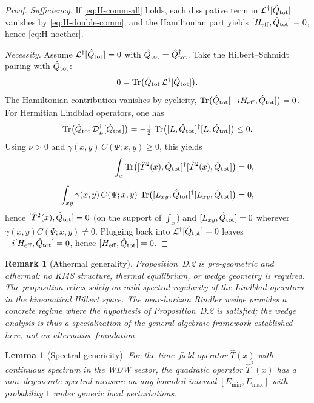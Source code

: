 \documentclass[12pt,a4paper]{article}
\newtheorem{lemma}{Lemma}[section]
\newtheorem{remark}{Remark}[section]
\renewcommand{\Tr}{\operatorname{Tr}}
\numberwithin{equation}{section}
\begin{document}
\vspace{0.3cm}
\begin{proof}
\emph{Sufficiency.} If \eqref{eq:H-comm-all} holds, each dissipative term in $\mathcal L^\dagger[\hat Q_{\rm tot}]$ vanishes by \eqref{eq:H-double-comm}, and the Hamiltonian part yields $[H_{\mathrm{eff}},\hat Q_{\rm tot}]=0$, hence \eqref{eq:H-noether}.

\vspace{0.3cm}
\noindent\emph{Necessity.}
Assume $\mathcal L^\dagger[\hat Q_{\rm tot}]=0$ with $\hat Q_{\rm tot}=\hat Q_{\rm tot}^\dagger$.
Take the Hilbert--Schmidt pairing with $\hat Q_{\rm tot}$:
\[
0=\Tr\!\big(\hat Q_{\rm tot}\,\mathcal L^\dagger[\hat Q_{\rm tot}]\big).
\]
The Hamiltonian contribution vanishes by cyclicity,
$\Tr\!\big(\hat Q_{\rm tot}[-iH_{\rm eff},\hat Q_{\rm tot}]\big)=0$.
For Hermitian Lindblad operators, one has
\[
\Tr\!\big(\hat Q_{\rm tot}\,\mathcal D_L^\dagger[\hat Q_{\rm tot}]\big)
=-\tfrac12\,\Tr\!\big([L,\hat Q_{\rm tot}]^\dagger [L,\hat Q_{\rm tot}]\big)\le 0.
\]
Using $\nu>0$ and $\gamma(x,y)\,C(\Psi;x,y)\ge 0$, this yields
\begin{align*}
\int_x \Tr\!\big([\hat T^2(x),\hat Q_{\rm tot}]^\dagger[\hat T^2(x),\hat Q_{\rm tot}]\big) &= 0, \\[6pt]
\int_{xy}\gamma(x,y)\,C(\Psi;x,y)\,
\Tr\!\big([L_{xy},\hat Q_{\rm tot}]^\dagger[L_{xy},\hat Q_{\rm tot}]\big) &= 0,
\end{align*}
hence $[\hat T^2(x),\hat Q_{\rm tot}]=0$ (on the support of $\int_x$) and
$[L_{xy},\hat Q_{\rm tot}]=0$ wherever $\gamma(x,y)C(\Psi;x,y)\neq 0$.
Plugging back into $\mathcal L^\dagger[\hat Q_{\rm tot}]=0$ leaves
$-i[H_{\rm eff},\hat Q_{\rm tot}]=0$, hence $[H_{\rm eff},\hat Q_{\rm tot}]=0$.
\end{proof}

\begin{remark}[Athermal generality]
Proposition~D.2 is pre-geometric and athermal: no KMS structure, thermal equilibrium, or wedge geometry is required. The proposition relies solely on mild spectral regularity of the Lindblad operators in the kinematical Hilbert space. The near-horizon Rindler wedge provides a concrete regime where the hypothesis of Proposition~D.2 is satisfied; the wedge analysis is thus a specialization of the general algebraic framework established here, not an alternative foundation.
\end{remark}

\begin{lemma}[Spectral genericity]\label{lem:spectral-generic}
For the time–field operator $\hat T(x)$ with continuous spectrum in the WDW sector, the quadratic operator $\hat T^2(x)$ has a non–degenerate spectral measure on any bounded interval $[E_{\min},E_{\max}]$ with probability $1$ under generic local perturbations.
\end{lemma}
\end{document}
